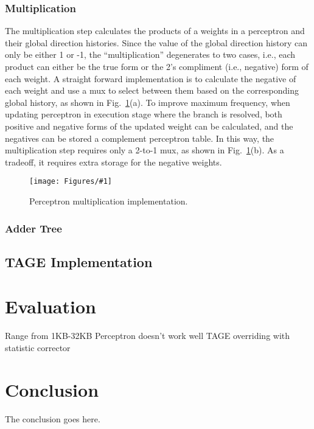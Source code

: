 \documentclass[conference]{IEEEtran}
\newcommand{\kfig}[4]{ %
        \begin{figure}[!t]
        \centering
        \texttt{[image: Figures/\#1]}
        \vspace{-1mm}
        \caption{#3}
        \label{#2}
        \end{figure}
}
\begin{document}
\subsubsection{Multiplication}
\label{sec:fpga:perceptron:mult}
The multiplication step calculates the products of a weights in a perceptron and their global direction histories. Since the value of the global direction history can only be either 1 or -1, the ``multiplication'' degenerates to two cases, i.e., each product can either be the true form or the 2's compliment (i.e., negative) form of each weight. A straight forward implementation is to calculate the negative of each weight and use a mux to select between them based on the corresponding global history, as shown in Fig.~\ref{fig:perceptronMult}(a). To improve maximum frequency, when updating perceptron in execution stage where the branch is resolved, both positive and negative forms of the updated weight can be calculated, and the negatives can be stored a complement perceptron table. In this way, the multiplication step requires only a 2-to-1 mux, as shown in Fig.~\ref{fig:perceptronMult}(b). As a tradeoff, it requires extra storage for the negative weights.
\kfig{perceptronMult.pdf}{fig:perceptronMult}{Perceptron multiplication implementation.}{angle = 0, trim = 0.3in 2in 3in 0.6in, clip, width=0.4\textwidth}



\subsubsection{Adder Tree}
\label{sec:fpga:perceptron:adder}





\subsection{TAGE Implementation}
\label{sec:fpga:tage}






\section{Evaluation}
\label{sec:eval}
Range from 1KB-32KB
Perceptron doesn't work well
TAGE overriding with statistic corrector


\section{Conclusion}
The conclusion goes here.












\end{document}
